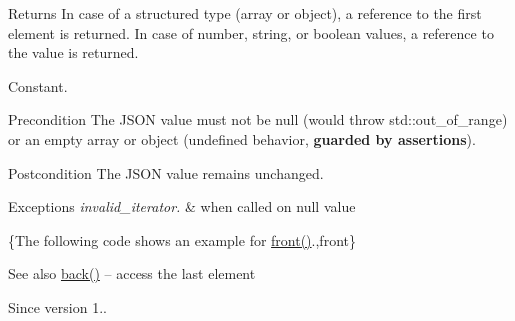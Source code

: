 \begin{DoxyReturn}{Returns}
In case of a structured type (array or object), a reference to the first element is returned. In case of number, string, or boolean values, a reference to the value is returned.
\end{DoxyReturn}
Constant.

\begin{DoxyPrecond}{Precondition}
The J\+S\+ON value must not be {\ttfamily null} (would throw {\ttfamily std\+::out\+\_\+of\+\_\+range}) or an empty array or object (undefined behavior, {\bfseries guarded by assertions}). 
\end{DoxyPrecond}
\begin{DoxyPostcond}{Postcondition}
The J\+S\+ON value remains unchanged.
\end{DoxyPostcond}

\begin{DoxyExceptions}{Exceptions}
{\em invalid\+\_\+iterator.} & when called on {\ttfamily null} value\\
\hline
\end{DoxyExceptions}
\{The following code shows an example for {\ttfamily \hyperlink{classnlohmann_1_1basic__json_a3acba9c6ceb7214e565fe08c3ba5b352}{front()}}.,front\}

\begin{DoxySeeAlso}{See also}
\hyperlink{classnlohmann_1_1basic__json_a011397134847f36db0ed7d7a93753677}{back()} -- access the last element
\end{DoxySeeAlso}
\begin{DoxySince}{Since}
version 1.. 
\end{DoxySince}
